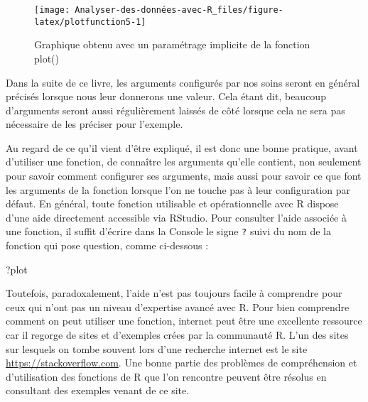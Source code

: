 \documentclass[
]{book}
\newenvironment{Shaded}{\begin{snugshade}}{\end{snugshade}}
\newcommand{\FunctionTok}[1]{\textcolor[rgb]{0.00,0.00,0.00}{#1}}
\newcommand{\NormalTok}[1]{#1}
\newcommand{\SpecialCharTok}[1]{\textcolor[rgb]{0.00,0.00,0.00}{#1}}
\begin{document}
\begin{Shaded}
\end{Shaded}

\begin{figure}

{\centering \texttt{[image: Analyser-des-données-avec-R\_files/figure-latex/plotfunction5-1]} 

}

\caption{Graphique obtenu avec un paramétrage implicite de la fonction plot()}\label{fig:plotfunction5}
\end{figure}

Dans la suite de ce livre, les arguments configurés par nos soins seront en général précisés lorsque nous leur donnerons une valeur. Cela étant dit, beaucoup d'arguments seront aussi régulièrement laissés de côté lorsque cela ne sera pas nécessaire de les préciser pour l'exemple.

Au regard de ce qu'il vient d'être expliqué, il est donc une bonne pratique, avant d'utiliser une fonction, de connaître les arguments qu'elle contient, non seulement pour savoir comment configurer ses arguments, mais aussi pour savoir ce que font les arguments de la fonction lorsque l'on ne touche pas à leur configuration par défaut. En général, toute fonction utilisable et opérationnelle avec R dispose d'une aide directement accessible via RStudio. Pour consulter l'aide associée à une fonction, il suffit d'écrire dans la Console le signe \texttt{?} suivi du nom de la fonction qui pose question, comme ci-dessous :

\begin{Shaded}
\begin{Highlighting}[]
\NormalTok{?plot}
\end{Highlighting}
\end{Shaded}

Toutefois, paradoxalement, l'aide n'est pas toujours facile à comprendre pour ceux qui n'ont pas un niveau d'expertise avancé avec R. Pour bien comprendre comment on peut utiliser une fonction, internet peut être une excellente ressource car il regorge de sites et d'exemples crées par la communauté R. L'un des sites sur lesquels on tombe souvent lors d'une recherche internet est le site \url{https://stackoverflow.com}. Une bonne partie des problèmes de compréhension et d'utilisation des fonctions de R que l'on rencontre peuvent être résolus en consultant des exemples venant de ce site.
\end{document}
